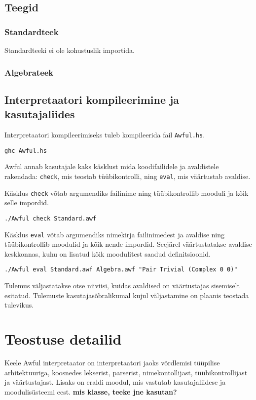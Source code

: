 \documentclass[12pt]{article}
\newcommand\peatykk[1]{
  \clearpage
  \section{#1}}
\newcommand\markus[1]{\textcolor{roheline}{\textbf{#1}}}
\begin{document}
    \subsection{Teegid}
      
      \subsubsection{Standardteek}
        Standardteeki ei ole kohustuslik importida.
      \subsubsection{Algebrateek}
        
    \subsection{Interpretaatori kompileerimine ja kasutajaliides}
      Interpretaatori kompileerimiseks tuleb kompileerida fail \verb!Awful.hs!.

      \begin{verbatim}ghc Awful.hs\end{verbatim}

      Awful annab kasutajale kaks käsklust mida koodifailidele ja avaldistele rakendada: \verb!check!, mis teostab tüübikontrolli, ning \verb!eval!, mis väärtustab avaldise.

      Käsklus \verb!check! võtab argumendiks failinime ning tüübikontrollib mooduli ja kõik selle impordid.

      \begin{verbatim}./Awful check Standard.awf\end{verbatim}

      Käsklus \verb!eval! võtab argumendiks nimekirja failinimedest ja avaldise ning tüübikontrollib moodulid ja kõik nende impordid. Seejärel väärtustatakse avaldise keskkonnas, kuhu on lisatud kõik moodulitest saadud definitsioonid.

      \begin{verbatim}./Awful eval Standard.awf Algebra.awf "Pair Trivial (Complex 0 0)"\end{verbatim}

      Tulemus väljastatakse otse niiviisi, kuidas avaldised on väärtustajas sisemiselt esitatud. Tulemuste kasutajasõbralikumal kujul väljastamine on plaanis teostada tulevikus.
  \peatykk{Teostuse detailid}
    Keele Awful interpretaator on interpretaatori jaoks võrdlemisi tüüpilise arhitektuuriga, koosnedes lekserist, parserist, nimekontollijast, tüübikontrollijast ja väärtustajast. Lisaks on eraldi moodul, mis vastutab kasutajaliidese ja moodulisüsteemi eest. \markus{mis klasse, teeke jne kasutan?}
\end{document}
